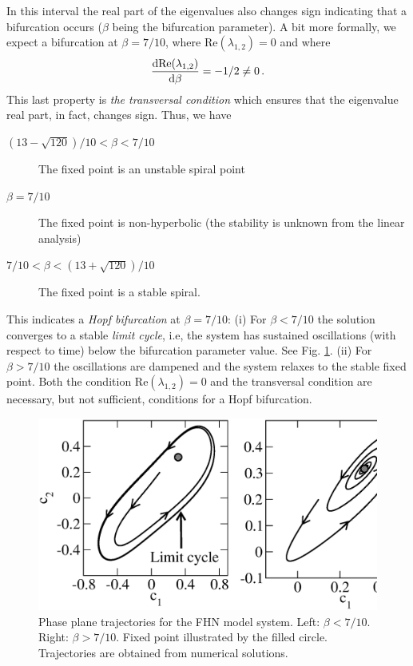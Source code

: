 In this interval the real part of the eigenvalues also
changes sign indicating that a bifurcation occurs ($\beta$ being the bifurcation parameter). 
A bit more formally, we expect a bifurcation at $\beta=7/10$, where 
$\text{Re}(\lambda_{1,2})=0$ and where 
\begin{eqnarray}
	\frac{\mathrm{d}\text{Re}(\lambda_{1,2})}{\mathrm{d} \beta} = -1/2 \neq 0 \, .
\end{eqnarray}
This last property is \emph{the transversal condition} which ensures 
that the eigenvalue real part, in fact, changes sign. Thus, we have 
\begin{description}
	\item[$(13 - \sqrt{120})/10 < \beta < 7/10$]{The fixed point is an unstable spiral point}
	\item[$\beta = 7/10$]{The fixed point is non-hyperbolic (the stability is unknown from the linear analysis)}
	\item[$7/10 <\beta < (13 + \sqrt{120})/10$]{The fixed point is a stable spiral.}
\end{description}
This indicates a \emph{Hopf bifurcation} at $\beta = 7/10$: 
(i) For $\beta < 7/10$ the solution converges to a stable \emph{limit cycle}, 
i.e, the system has sustained oscillations (with respect to time) 
below the bifurcation parameter value. See Fig. \ref{fig:fhnbif}. 
(ii) For $\beta > 7/10$ the oscillations are dampened 
and the system relaxes to the stable fixed point. 
Both the condition $\text{Re}(\lambda_{1,2})=0$ and the transversal 
condition are necessary, but not sufficient, conditions for a Hopf bifurcation. 
\begin{figure}
  \begin{center}
    \includegraphics[scale=.45]{figs/fhnPhasePortrait.eps}
    \caption{
    \label{fig:fhnbif} Phase plane trajectories for the FHN model system. 
	  Left: $\beta < 7/10$. Right: $\beta>7/10$.
		Fixed point illustrated by the filled circle. 
		Trajectories are obtained from numerical solutions.
    }
  \end{center}
\end{figure}


